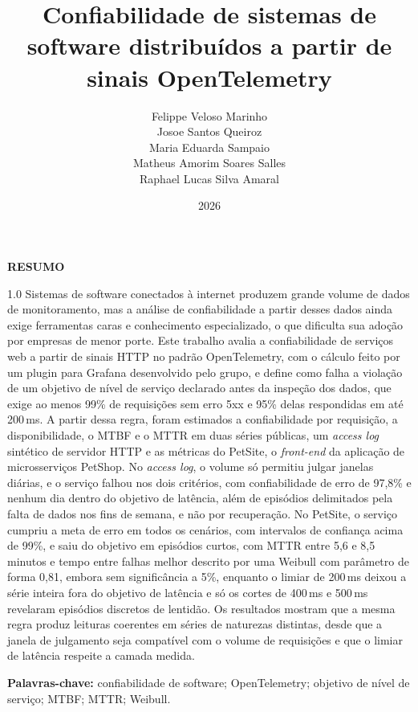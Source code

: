 \documentclass[12pt, a4paper, oneside]{article}
\title{\textbf{Confiabilidade de sistemas de software distribuídos a partir de sinais OpenTelemetry}}
\author{
  Felippe Veloso Marinho \\
  Josoe Santos Queiroz \\
  Maria Eduarda Sampaio \\
  Matheus Amorim Soares Salles \\
  Raphael Lucas Silva Amaral
}
\date{2026}
\begin{document}
\maketitle
\thispagestyle{fancy}

\begin{center}
\textbf{RESUMO}
\end{center}
\begin{spacing}{1.0}
\noindent Sistemas de software conectados à internet produzem grande volume de dados de monitoramento, mas a análise de confiabilidade a partir desses dados ainda exige ferramentas caras e conhecimento especializado, o que dificulta sua adoção por empresas de menor porte. Este trabalho avalia a confiabilidade de serviços web a partir de sinais HTTP no padrão OpenTelemetry, com o cálculo feito por um plugin para Grafana desenvolvido pelo grupo, e define como falha a violação de um objetivo de nível de serviço declarado antes da inspeção dos dados, que exige ao menos 99\% de requisições sem erro 5xx e 95\% delas respondidas em até 200\,ms. A partir dessa regra, foram estimados a confiabilidade por requisição, a disponibilidade, o MTBF e o MTTR em duas séries públicas, um \textit{access log} sintético de servidor HTTP e as métricas do PetSite, o \textit{front-end} da aplicação de microsserviços PetShop. No \textit{access log}, o volume só permitiu julgar janelas diárias, e o serviço falhou nos dois critérios, com confiabilidade de erro de 97,8\% e nenhum dia dentro do objetivo de latência, além de episódios delimitados pela falta de dados nos fins de semana, e não por recuperação. No PetSite, o serviço cumpriu a meta de erro em todos os cenários, com intervalos de confiança acima de 99\%, e saiu do objetivo em episódios curtos, com MTTR entre 5,6 e 8,5 minutos e tempo entre falhas melhor descrito por uma Weibull com parâmetro de forma 0,81, embora sem significância a 5\%, enquanto o limiar de 200\,ms deixou a série inteira fora do objetivo de latência e só os cortes de 400\,ms e 500\,ms revelaram episódios discretos de lentidão. Os resultados mostram que a mesma regra produz leituras coerentes em séries de naturezas distintas, desde que a janela de julgamento seja compatível com o volume de requisições e que o limiar de latência respeite a camada medida.

\vspace{0.5cm}
\noindent\textbf{Palavras-chave:} confiabilidade de software; OpenTelemetry; objetivo de nível de serviço; MTBF; MTTR; Weibull.
\end{spacing}
\end{document}
